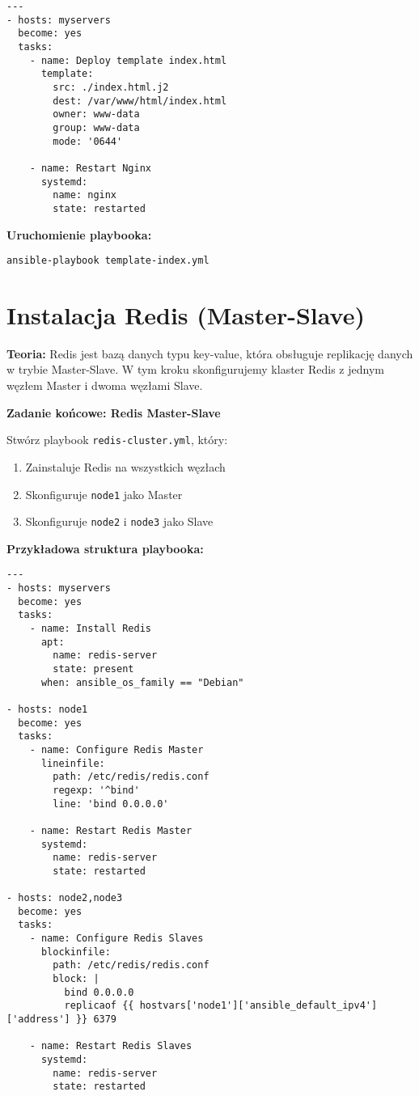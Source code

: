 \documentclass{article}
\begin{document}
\begin{lstlisting}
---
- hosts: myservers
  become: yes
  tasks:
    - name: Deploy template index.html
      template:
        src: ./index.html.j2
        dest: /var/www/html/index.html
        owner: www-data
        group: www-data
        mode: '0644'
        
    - name: Restart Nginx
      systemd:
        name: nginx
        state: restarted
\end{lstlisting}

\textbf{Uruchomienie playbooka:}

\noindent\begin{lstlisting}
ansible-playbook template-index.yml
\end{lstlisting}

\section{Instalacja Redis (Master-Slave)}

\textbf{Teoria:}  
Redis jest bazą danych typu key-value, która obsługuje replikację danych w trybie Master-Slave. W tym kroku skonfigurujemy klaster Redis z jednym węzłem Master i dwoma węzłami Slave.

\textbf{Zadanie końcowe: Redis Master-Slave}

Stwórz playbook \texttt{redis-cluster.yml}, który:
\begin{enumerate}
    \item Zainstaluje Redis na wszystkich węzłach
    \item Skonfiguruje \texttt{node1} jako Master
    \item Skonfiguruje \texttt{node2} i \texttt{node3} jako Slave
\end{enumerate}

\textbf{Przykładowa struktura playbooka:}
\begin{lstlisting}
---
- hosts: myservers
  become: yes
  tasks:
    - name: Install Redis
      apt:
        name: redis-server
        state: present
      when: ansible_os_family == "Debian"

- hosts: node1
  become: yes
  tasks:
    - name: Configure Redis Master
      lineinfile:
        path: /etc/redis/redis.conf
        regexp: '^bind'
        line: 'bind 0.0.0.0'
    
    - name: Restart Redis Master
      systemd:
        name: redis-server
        state: restarted

- hosts: node2,node3
  become: yes
  tasks:
    - name: Configure Redis Slaves
      blockinfile:
        path: /etc/redis/redis.conf
        block: |
          bind 0.0.0.0
          replicaof {{ hostvars['node1']['ansible_default_ipv4']['address'] }} 6379
    
    - name: Restart Redis Slaves
      systemd:
        name: redis-server
        state: restarted
\end{lstlisting}
\end{document}
